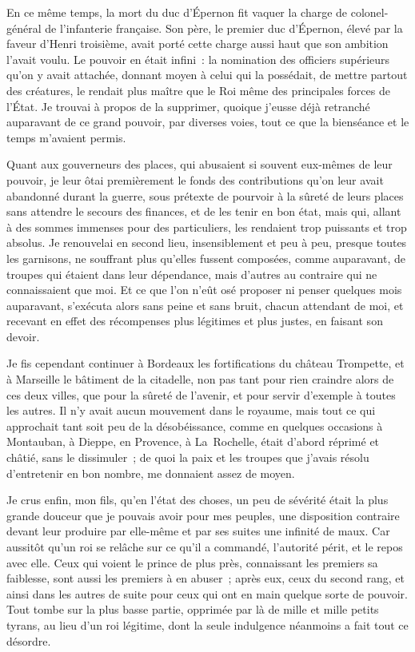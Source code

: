 \documentclass[french,twoside]{book} %
\begin{document}
En ce même temps, la mort du duc d’Épernon fit vaquer la charge de colonel-général de l’infanterie française. Son père, le premier duc d’Épernon, élevé par la faveur d’Henri troisième, avait porté cette charge aussi haut que son ambition l’avait voulu. Le pouvoir en était infini : la nomination des officiers supérieurs qu’on y avait attachée, donnant moyen à celui qui la possédait, de mettre partout des créatures, le rendait plus maître que le Roi même des principales forces de l’État. Je trouvai à propos de la supprimer, quoique j’eusse déjà retranché auparavant de ce grand pouvoir, par diverses voies, tout ce que la bienséance et le temps m’avaient permis.\par
Quant aux gouverneurs des places, qui abusaient si souvent eux-mêmes de leur pouvoir, je leur ôtai premièrement le fonds des contributions qu’on leur avait abandonné durant la guerre, sous prétexte de pourvoir à la sûreté de leurs places sans attendre le secours des finances, et de les tenir en bon état, mais qui, allant à des sommes immenses pour des particuliers, les rendaient trop puissants et trop absolus. Je renouvelai en second lieu, insensiblement et peu à peu, presque toutes les garnisons, ne souffrant plus qu’elles fussent composées, comme auparavant, de troupes qui étaient dans leur dépendance, mais d’autres au contraire qui ne connaissaient que moi. Et ce que l’on n’eût osé proposer ni penser quelques mois auparavant, s’exécuta alors sans peine et sans bruit, chacun attendant de moi, et recevant en effet des récompenses plus légitimes et plus justes, en faisant son devoir.\par
Je fis cependant continuer à Bordeaux les fortifications du château Trompette, et à Marseille le bâtiment de la citadelle, non pas tant pour rien craindre alors de ces deux villes, que pour la sûreté de l’avenir, et pour servir d’exemple à toutes les autres. Il n’y avait aucun mouvement dans le royaume, mais tout ce qui approchait tant soit peu de la désobéissance, comme en quelques occasions à Montauban, à Dieppe, en Provence, à La Rochelle, était d’abord réprimé et châtié, sans le dissimuler ; de quoi la paix et les troupes que j’avais résolu d’entretenir en bon nombre, me donnaient assez de moyen.\par
Je crus enfin, mon fils, qu’en l’état des choses, un peu de sévérité était la plus grande douceur que je pouvais avoir pour mes peuples, une disposition contraire devant leur produire par elle-même et par ses suites une infinité de maux. Car aussitôt qu’un roi se relâche sur ce qu’il a commandé, l’autorité périt, et le repos avec elle. Ceux qui voient le prince de plus près, connaissant les premiers sa faiblesse, sont aussi les premiers à en abuser ; après eux, ceux du second rang, et ainsi dans les autres de suite pour ceux qui ont en main quelque sorte de pouvoir. Tout tombe sur la plus basse partie, opprimée par là de mille et mille petits tyrans, au lieu d’un roi légitime, dont la seule indulgence néanmoins a fait tout ce désordre.\par
\end{document}
